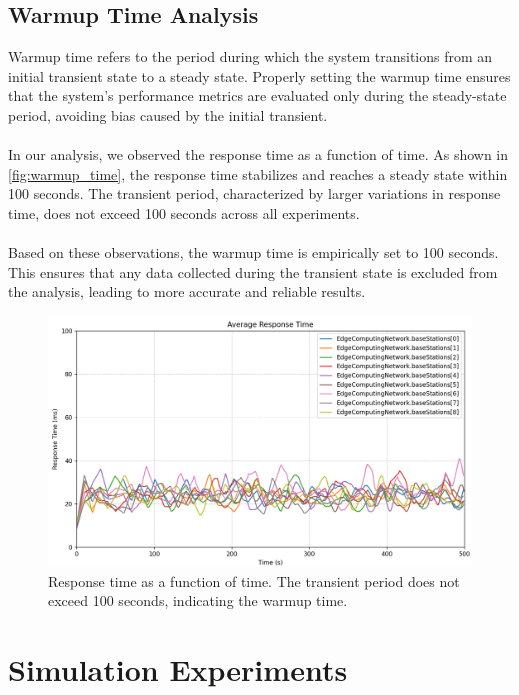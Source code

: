 \documentclass{report}
\begin{document}
\section{Warmup Time Analysis}
Warmup time refers to the period during which the system transitions from an initial transient state to a steady state. Properly setting the warmup time ensures that the system's performance metrics are evaluated only during the steady-state period, avoiding bias caused by the initial transient.\\\\
In our analysis, we observed the response time as a function of time. As shown in \autoref{fig:warmup_time}, the response time stabilizes and reaches a steady state within 100 seconds. The transient period, characterized by larger variations in response time, does not exceed 100 seconds across all experiments.\\\\
Based on these observations, the warmup time is empirically set to 100 seconds. This ensures that any data collected during the transient state is excluded from the analysis, leading to more accurate and reliable results.

\begin{figure}[h!]
    \centering
    \includegraphics[width=1\textwidth]{img/warmup_analysis.png}
    \caption{Response time as a function of time. The transient period does not exceed 100 seconds, indicating the warmup time.}
    \label{fig:warmup_time}
\end{figure}

\chapter{Simulation Experiments}
\end{document}
